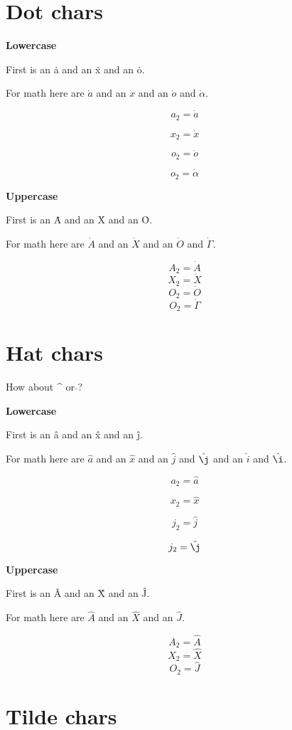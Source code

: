 \documentclass{article}
\begin{document}
\section{Dot chars}
\textbf{Lowercase}

First is an \.{a} and an \.{x} and an \.{o}.

For math here are $\dot{a}$ and an $\dot{x}$ and an $\dot{o}$ and $\dot{\alpha}$.

$$a_2=\dot{a}$$

$$x_2=\dot{x}$$

$$o_2=\dot{o}$$

$$o_2=\dot{\alpha}$$


\textbf{Uppercase}

First is an \.{A} and an \.{X} and an \.{O}.

For math here are $\dot{A}$ and an $\dot{X}$ and an $\dot{O}$ and $\dot{\Gamma}$.

$$A_2=\dot{A}$$
$$X_2=\dot{X}$$
$$O_2=\dot{O}$$
$$O_2=\dot{\Gamma}$$




\section{Hat chars}

How about \^{} or $\hat{}$? 

\textbf{Lowercase}

First is an \^{a} and an \^{x} and an \^{j}.

For math here are $\hat{a}$ and an $\hat{x}$ and an $\hat{j}$ and $\hat{\j}$ and an $\hat{i}$ and $\hat{\i}$.

$$a_2=\hat{a}$$

$$x_2=\hat{x}$$

$$j_2=\hat{j}$$

$$j_2=\hat{\j}$$

\textbf{Uppercase}

First is an \^{A} and an \^{X} and an \^{J}.

For math here are $\hat{A}$ and an $\hat{X}$ and an $\hat{J}$.

$$A_2=\hat{A}$$
$$X_2=\hat{X}$$
$$O_2=\hat{J}$$




\section{Tilde chars}
\end{document}
